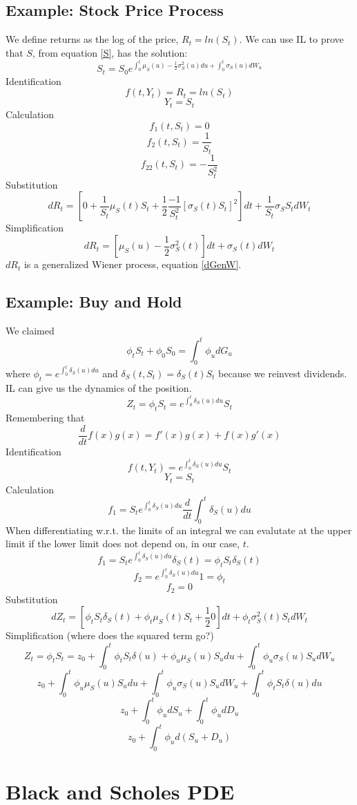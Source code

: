 \documentclass[12pt]{article}
\begin{document}
\subsection{Example: Stock Price Process}
We define returns as the log of the price, $R_t=ln(S_t)$. We can use IL to
prove that $S$, from equation \ref{S}, has the solution:
$$S_t=S_0e^{\int_0^t\mu_S(u)-\frac{1}{2}\sigma_S^2(u)du+
\int_0^t\sigma_S(u)dW_u}$$
Identification
$$f(t,Y_t)=R_t=ln(S_t)$$
$$Y_t=S_t$$
Calculation
$$f_1(t,S_t)=0$$
$$f_2(t, S_t)=\frac{1}{S_t}$$
$$f_{22}(t,S_t)=-\frac{1}{S_t^2}$$
Substitution
$$dR_t=\left[ 0+\frac{1}{S_t}\mu_S(t)S_t+\frac{1}{2}\frac{-1}{S_t^2}
\left[ \sigma_S(t)S_t \right] ^2 \right] dt+ \frac{1}{S_t}\sigma_SS_tdW_t$$
Simplification
$$dR_t= \left[ \mu_S(u)-\frac{1}{2}\sigma_S^2(t) \right] dt +
\sigma_S(t)dW_t$$
$dR_t$ is a generalized Wiener process, equation \ref{dGenW}.

\subsection{Example: Buy and Hold}

We claimed
$$\phi_tS_t + \phi_0S_0=\int_0^t\phi_udG_u$$
where $\phi_t=e^{\int_0^t\delta_S(u)du}$ and $\delta_S(t, S_t)=\delta_S(t)S_t$
because we reinvest dividends.
IL can give us the dynamics of the position.
$$Z_t=\phi_tS_t=e^{\int_0^t\delta_S(u)du}S_t$$
Remembering that
$$\frac{d}{dt}f(x)g(x)=f'(x)g(x)+f(x)g'(x)$$
Identification
$$f(t, Y_t)=e^{\int_0^t\delta_S(u)du}S_t$$
$$Y_t=S_t$$
Calculation
$$f_1=S_te^{\int_0^t\delta_S(u)du}\frac{d}{dt}\int_0^t\delta_S(u)du$$
When differentiating w.r.t. the limits of an integral we can evalutate at the
upper limit if the lower limit does not depend on, in our case, $t$.
$$f_1=S_te^{\int_0^t\delta_S(u)du}\delta_S(t)=\phi_tS_t\delta_S(t)$$
$$f_2=e^{\int_0^t\delta_S(u)du}1=\phi_t$$
$$f_2=0$$
Substitution
$$dZ_t=\left[ \phi_tS_t\delta_S(t) + \phi_t\mu_S(t)S_t +\frac{1}{2}0  \right]
dt + \phi_t\sigma_S^2(t)S_tdW_t$$
Simplification (where does the squared term go?)
$$Z_t=\phi_tS_t=z_0+\int_0^t\phi_tS_t\delta(u)+
\phi_u\mu_S(u)S_udu+\int_0^t\phi_u\sigma_S(u)S_udW_u$$
$$z_0+\int_0^t\phi_u\mu_S(u)S_udu+
\int_0^t\phi_u\sigma_S(u)S_udW_u+\int_0^t\phi_tS_t\delta(u)du$$
$$z_0+\int_0^t\phi_udS_u+\int_0^t\phi_udD_u$$
$$z_0+\int_0^t\phi_ud(S_u+D_u)$$

\section{Black and Scholes PDE}
\end{document}
